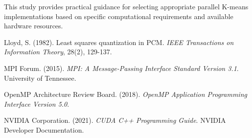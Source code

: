 \documentclass[10pt,a4paper,twocolumn]{article}
\begin{document}
This study provides practical guidance for selecting appropriate parallel K-means implementations based on specific computational requirements and available hardware resources.


\begin{thebibliography}{9}
Lloyd, S. (1982). Least squares quantization in PCM. \emph{IEEE Transactions on Information Theory}, 28(2), 129-137.

MPI Forum. (2015). \emph{MPI: A Message-Passing Interface Standard Version 3.1}. University of Tennessee.

OpenMP Architecture Review Board. (2018). \emph{OpenMP Application Programming Interface Version 5.0}. 

NVIDIA Corporation. (2021). \emph{CUDA C++ Programming Guide}. NVIDIA Developer Documentation.
\end{thebibliography}
\end{document}
